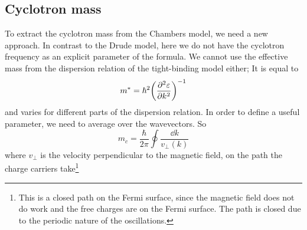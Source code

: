 \subsection{Cyclotron mass}
To extract the cyclotron mass from the Chambers model, we need a new approach. In contrast to the
Drude model, here we do not have the cyclotron frequency as an explicit parameter of the formula.
We cannot use the effective mass from the dispersion relation of the tight-binding model either;
It is equal to
\begin{equation}
    m^* = \hbar^2\qty(\pdv[2]{\varepsilon}{k})^{-1}
\end{equation}
and varies for different parts of the dispersion relation. In order to define a useful parameter,
we need to average over the wavevectors. So
\begin{equation}
    m_c = \frac{\hbar}{2\pi}\oint\frac{\dd{k}}{v_\perp (k)}
\end{equation}
where $v_\perp$ is the velocity perpendicular to the magnetic field, on the path the charge
carriers take\footnote{This is a closed path on the Fermi surface, since the magnetic field does
not do work and the free charges are on the Fermi surface. The path is closed due to the periodic
nature of the oscillations.}